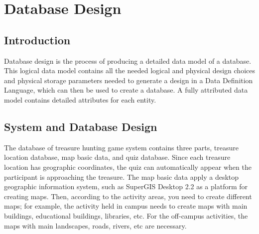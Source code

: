 	\makeatletter
	\def\@makechapterhead#1{%
	  \vspace*{50\p@}%
	  {\parindent \z@ \centering\normalfont
	    \ifnum \c@secnumdepth >\m@ne
	      \if@mainmatter
	         \Large\bfseries \@chapapp\space \thechapter
 	        \par\nobreak
	        \vskip 20\p@
	      \fi
	    \fi
	    \interlinepenalty\@M
	     \Large \bfseries #1\par\nobreak
	
	    \vskip 40\p@
	  }}
	\def\@makeschapterhead#1{%
	  \vspace*{50\p@}%
	  {\parindent \z@ \centering 
	    \normalfont
	    \interlinepenalty\@M
	    \Large\bfseries  #1\par\nobreak
	    \vskip 40\p@
	  }}
	\makeatother
	\titlespacing*{\chapter}{0pt}{0pt}{12pt}

\sectionfont{\fontsize{12}}
\titlespacing*{\chapter}{0pt}{0pt}{12pt}
\sectionfont{\fontsize{12}}

\chapter{Database Design}

\section{Introduction}
Database design is the process of producing a detailed data model of a database. This logical data model contains all the needed logical and physical design choices and physical storage parameters needed to generate a design in a Data Definition Language, which can then be used to create a database. A fully attributed data model contains detailed attributes for each entity. 

	\section{System and Database Design}
	
	The database of treasure hunting game system contains three parts, treasure location database, map basic data, and quiz database. Since each treasure location has geographic coordinates, the quiz can automatically appear when the participant is approaching the treasure. The map basic data apply a desktop geographic information system, such as SuperGIS Desktop 2.2 as a platform for creating maps. Then, according to the activity areas, you need to create different maps; for example, the activity held in campus needs to create maps with main buildings, educational buildings, libraries, etc. For the off-campus activities, the maps with main landscapes, roads, rivers, etc are necessary.
	
